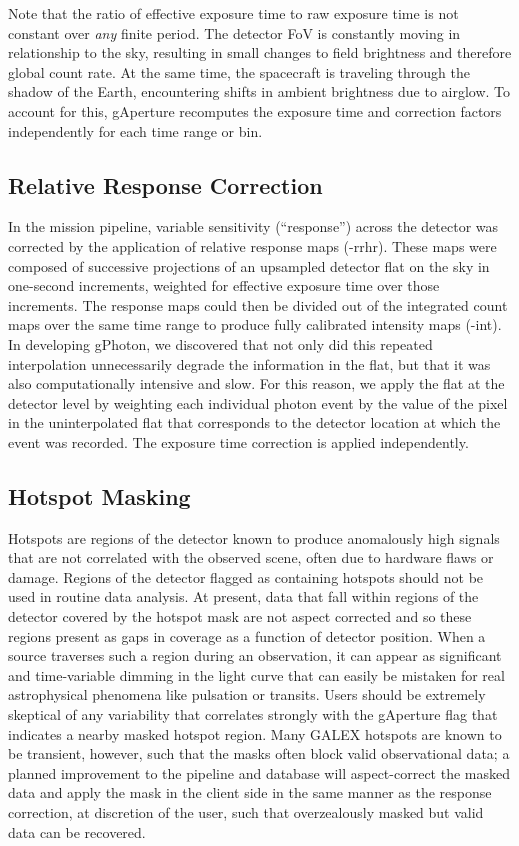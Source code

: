 \documentclass[preprint]{aastex}
\begin{document}
Note that the ratio of effective exposure time to raw exposure time is not constant over \emph{any} finite period. The detector FoV is constantly moving in relationship to the sky, resulting in small changes to field brightness and therefore global count rate. At the same time, the spacecraft is traveling through the shadow of the Earth, encountering shifts in ambient brightness due to airglow. To account for this, gAperture recomputes the exposure time and correction factors independently for each time range or bin.

\subsection{Relative Response Correction}
\label{relresponsecorr}
In the mission pipeline, variable sensitivity (``response'') across the detector was corrected by the application of relative response maps (-rrhr). These maps were composed of successive projections of an upsampled detector flat on the sky in one-second increments, weighted for effective exposure time over those increments. The response maps could then be divided out of the integrated count maps over the same time range to produce fully calibrated intensity maps (-int). In developing gPhoton, we discovered that not only did this repeated interpolation unnecessarily degrade the information in the flat, but that it was also computationally intensive and slow. For this reason, we apply the flat at the detector level by weighting each individual photon event by the value of the pixel in the uninterpolated flat that corresponds to the detector location at which the event was recorded. The exposure time correction is applied independently.

\subsection{Hotspot Masking}
\label{hotspot}
Hotspots are regions of the detector known to produce anomalously high signals that are not correlated with the observed scene, often due to hardware flaws or damage. Regions of the detector flagged as containing hotspots should not be used in routine data analysis. At present, data that fall within regions of the detector covered by the hotspot mask are not aspect corrected and so these regions present as gaps in coverage as a function of detector position. When a source traverses such a region during an observation, it can appear as significant and time-variable dimming in the light curve that can easily be mistaken for real astrophysical phenomena like pulsation or transits. Users should be extremely skeptical of any variability that correlates strongly with the gAperture flag that indicates a nearby masked hotspot region. Many GALEX hotspots are known to be transient, however, such that the masks often block valid observational data; a planned improvement to the pipeline and database will aspect-correct the masked data and apply the mask in the client side in the same manner as the response correction, at discretion of the user, such that overzealously masked but valid data can be recovered.
\end{document}
